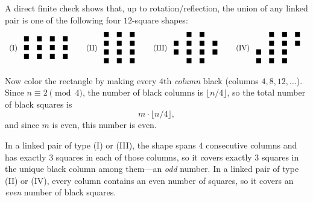 A direct finite check shows that, up to rotation/reflection, the union of any linked pair is one of the following four $12$-square shapes:
\[
\begin{array}{c@{\qquad}c@{\qquad}c@{\qquad}c}
\text{(I)}\ \begin{array}{cccc}
\blacksquare&\blacksquare&\blacksquare&\blacksquare\\
\blacksquare&\blacksquare&\blacksquare&\blacksquare\\
\blacksquare&\blacksquare&\blacksquare&\blacksquare
\end{array}
&
\text{(II)}\ \begin{array}{ccc}
\blacksquare&\blacksquare&\blacksquare\\
\blacksquare&\blacksquare&\blacksquare\\
\blacksquare&\blacksquare&\blacksquare\\
\blacksquare&\blacksquare&\blacksquare
\end{array}
&
\text{(III)}\ \begin{array}{cccc}
\phantom{\blacksquare}&\blacksquare&\blacksquare&\phantom{\blacksquare}\\
\blacksquare&\blacksquare&\blacksquare&\blacksquare\\
\blacksquare&\blacksquare&\blacksquare&\blacksquare\\
\phantom{\blacksquare}&\blacksquare&\blacksquare&\phantom{\blacksquare}
\end{array}
&
\text{(IV)}\ \begin{array}{cccc}
\phantom{\blacksquare}&\blacksquare&\blacksquare&\blacksquare\\
\phantom{\blacksquare}&\blacksquare&\blacksquare&\blacksquare\\
\blacksquare&\blacksquare&\blacksquare&\phantom{\blacksquare}\\
\blacksquare&\blacksquare&\blacksquare&\phantom{\blacksquare}
\end{array}
\end{array}
\]

\noindent Now color the rectangle by making every $4$th \emph{column} black (columns $4,8,12,\dots$).
Since $n\equiv 2\pmod4$, the number of black columns is $\lfloor n/4\rfloor$, so the total number of black squares is
\[m\cdot\lfloor n/4\rfloor,\]
and since $m$ is even, this number is even.

In a linked pair of type (I) or (III), the shape spans $4$ consecutive columns and has exactly $3$ squares in each of those columns,
so it covers exactly $3$ squares in the unique black column among them---an \emph{odd} number.
In a linked pair of type (II) or (IV), every column contains an even number of squares, so it covers an \emph{even} number of black squares.

